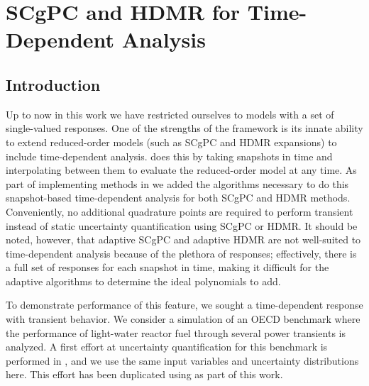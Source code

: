 
\chapter{SCgPC and HDMR for Time-Dependent Analysis} %

\label{ch:timedep} %



\section{Introduction}
Up to now in this work we have restricted ourselves to models with a set of single-valued responses.  One of the strengths
of the \raven{} \cite{OECDraven} framework is its innate ability to extend reduced-order models (such as 
SCgPC and HDMR expansions) to
include time-dependent analysis.  \raven{} does this by taking snapshots in time and interpolating between them to evaluate
the reduced-order model at any time.  As part of implementing methods in \raven{} we added the algorithms necessary to do 
this snapshot-based
time-dependent analysis for both SCgPC and HDMR methods. 
Conveniently, no additional quadrature points are required to perform transient instead of static
uncertainty quantification using SCgPC or HDMR.  It should be noted, however, that adaptive SCgPC and adaptive
HDMR are not well-suited to time-dependent analysis because of the plethora of responses; effectively, there is a
full set of responses for each snapshot in time, making it difficult for the adaptive algorithms to determine the
ideal polynomials to add.

To demonstrate performance of this feature, we sought a time-dependent response with transient behavior.
We consider a  \bison{} \cite{OECDbison} simulation of an OECD benchmark \cite{OECDbenchmark} where the 
performance of light-water reactor fuel 
through several power transients is analyzed.  A first effort at uncertainty quantification for this benchmark
is performed in \cite{OECDdakota}, and we use the same input variables and uncertainty distributions here.
This effort has been duplicated using \raven{} \cite{ans2016winter} as part of this work.

